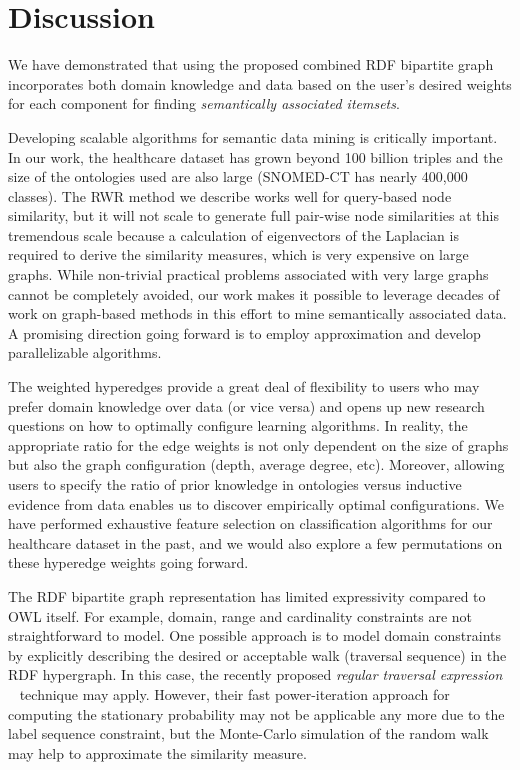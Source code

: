 \section{Discussion}
\label{sec:discussion}
We have demonstrated that using the proposed combined RDF bipartite graph incorporates both domain knowledge and data based on the user's desired weights for each component for finding \emph{semantically associated itemsets}.

Developing scalable algorithms for semantic data mining is critically important. In our work, the healthcare dataset has grown beyond 100 billion triples and the size of the ontologies used are also large (SNOMED-CT has nearly 400,000 classes). The RWR method we describe works well for query-based node similarity, but it will not scale to generate full pair-wise node similarities at this tremendous scale because a calculation of eigenvectors of the Laplacian is required to derive the similarity measures, which is very expensive on large graphs. While non-trivial practical problems associated with very large graphs cannot be completely avoided, our work makes it possible to leverage decades of work on graph-based methods in this effort to mine semantically associated data. A promising direction going forward is to employ approximation and develop parallelizable algorithms.

The weighted hyperedges provide a great deal of flexibility to users who may prefer domain knowledge over data (or vice versa) and opens up new research questions on how to optimally configure learning algorithms. In reality, the appropriate ratio for the edge weights is not only dependent on the size of graphs but also the graph configuration (depth, average degree, etc). Moreover, allowing users to specify the ratio of prior knowledge in ontologies versus inductive evidence from data enables us to discover empirically optimal configurations. We have performed exhaustive feature selection on classification algorithms for our healthcare dataset in the past, and we would also explore a few permutations on these hyperedge weights going forward.

The RDF bipartite graph representation has limited expressivity compared to OWL itself. For example, domain, range and cardinality constraints are not straightforward to model.  One possible approach is to model domain constraints by explicitly describing the desired or acceptable walk (traversal sequence) in the RDF hypergraph. In this case, the recently proposed \emph{regular traversal expression} ~\cite{Marko10} technique may apply. However, their fast power-iteration approach for computing the stationary probability may not be applicable any more due to the label sequence constraint, but the Monte-Carlo simulation of the random walk may help to approximate the similarity measure.
